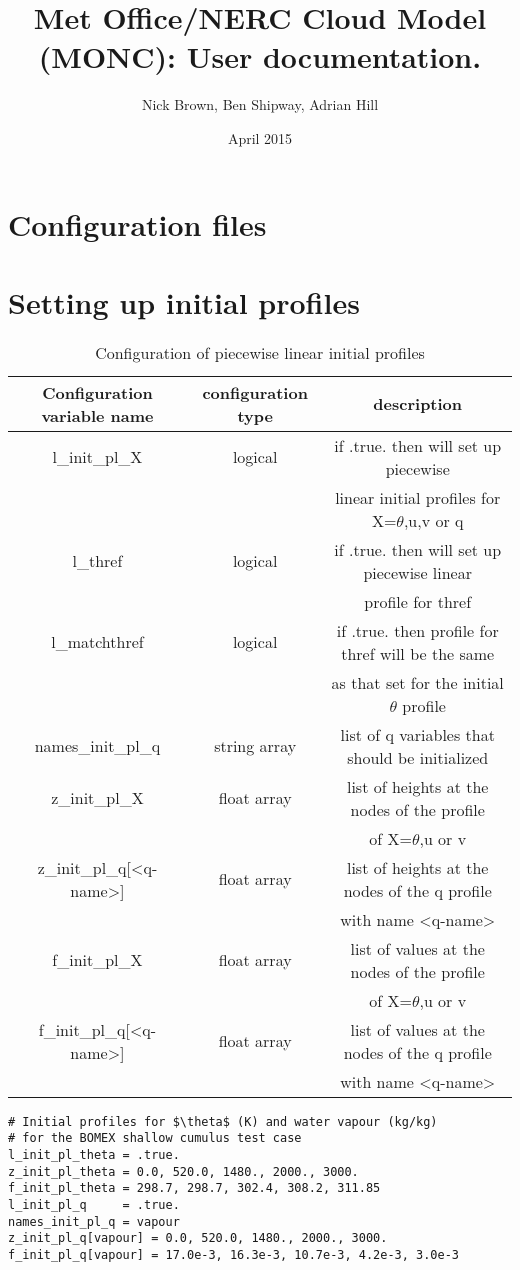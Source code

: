 \documentclass[a4paper,11pt]{article}
\title{Met Office/NERC Cloud Model (MONC): User documentation.}
\author{Nick Brown, Ben Shipway, Adrian Hill}
\date{April 2015} %
\begin{document}
\maketitle
\newpage
\tableofcontents
\newpage

\section{Configuration files}




\section{Setting up initial profiles}

\begin{table}
\protect\caption{Configuration of piecewise linear initial profiles}
\begin{tabular}{|c|c|c|}
\hline 
Configuration variable name & configuration type & description\tabularnewline
\hline 
\hline 
l\_init\_pl\_X & logical & if .true. then will set up piecewise  \tabularnewline
 &  & linear initial profiles for X=$\theta$,u,v or q\tabularnewline
\hline 
l\_thref & logical & if .true. then will set up piecewise linear \tabularnewline
\hline 
 &  & profile for thref\tabularnewline
\hline 
l\_matchthref & logical & if .true. then profile for thref will be the same\tabularnewline
 &  &  as that set for the initial $\theta$ profile\tabularnewline
\hline 
names\_init\_pl\_q & string array & list of q variables that should be initialized\tabularnewline
\hline 
z\_init\_pl\_X & float array & list of heights at the nodes of the profile\tabularnewline
 &  & of X=$\theta$,u or v\tabularnewline
\hline 
z\_init\_pl\_q{[\textless q-name\textgreater]} & float array & list of heights at the nodes of the q profile\tabularnewline
 &  & with name \textless q-name\textgreater\tabularnewline
\hline 
f\_init\_pl\_X & float array & list of values at the nodes of the profile\tabularnewline
 &  & of X=$\theta$,u or v\tabularnewline
\hline 
f\_init\_pl\_q{[\textless q-name\textgreater]} & float array & list of values at the nodes of the q profile\tabularnewline
 &  & with name \textless q-name\textgreater\tabularnewline
\hline 
\end{tabular}
\end{table}

\begin{lstlisting}[caption={Example configuration snippet for initial profiles from BOMEX\_config}]
# Initial profiles for $\theta$ (K) and water vapour (kg/kg)
# for the BOMEX shallow cumulus test case
l_init_pl_theta = .true.
z_init_pl_theta = 0.0, 520.0, 1480., 2000., 3000.
f_init_pl_theta = 298.7, 298.7, 302.4, 308.2, 311.85
l_init_pl_q     = .true.
names_init_pl_q = vapour
z_init_pl_q[vapour] = 0.0, 520.0, 1480., 2000., 3000.
f_init_pl_q[vapour] = 17.0e-3, 16.3e-3, 10.7e-3, 4.2e-3, 3.0e-3
\end{lstlisting}
\end{document}
